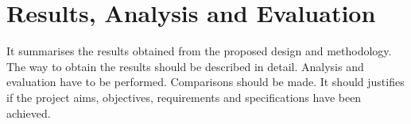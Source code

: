 \section{Results, Analysis and Evaluation}
	It summarises the results obtained from the proposed design and methodology. The way to obtain the results should be described in detail. Analysis and evaluation have to be performed. Comparisons should be made. It should justifies if the project aims, objectives, requirements and specifications have been achieved.